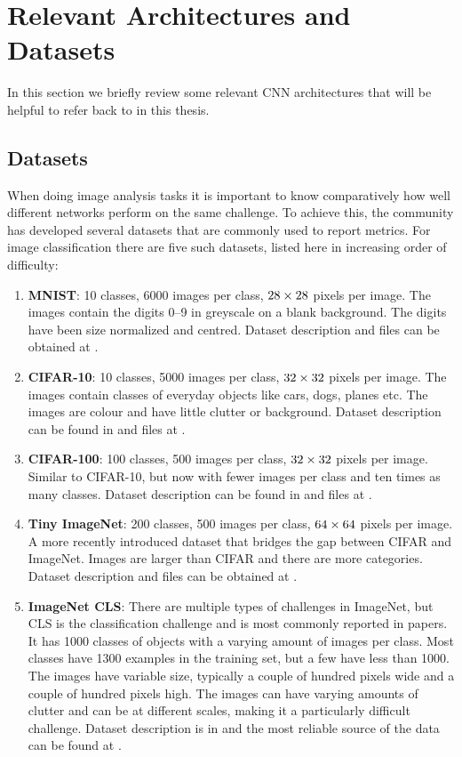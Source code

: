 \section{Relevant Architectures and Datasets}
In this section we briefly review some relevant CNN architectures that will be
helpful to refer back to in this thesis.

\subsection{Datasets}
When doing image analysis tasks it is important to know comparatively how well
different networks perform on the same challenge. To achieve this, the
community has developed several datasets that are commonly used to report
metrics. For image classification there are five such datasets, listed here in
increasing order of difficulty:
\begin{enumerate}
  \item \textbf{MNIST}: 10 classes, 6000 images per class, $28\times 28$ pixels per image.
    The images contain the digits 0--9 in greyscale on a blank background. The
    digits have been size normalized and centred. Dataset description and files can be obtained
    at \cite{lecun_modified_1998}.
  \item \textbf{CIFAR-10}: 10 classes, 5000 images per class, $32\times 32$ pixels per image.
    The images contain classes of everyday objects like cars, dogs, planes etc.
    The images are colour and have little clutter or background. Dataset
    description can be found in \cite{krizhevsky_learning_2009} and files at
    \cite{krizhevsky_cifar_2009}.
  \item \textbf{CIFAR-100}: 100 classes, 500 images per class, $32\times 32$ pixels per image.
    Similar to CIFAR-10, but now with fewer images per class and ten times as
    many classes. Dataset description can be found in
    \cite{krizhevsky_learning_2009} and files at \cite{krizhevsky_cifar_2009}.
  \item \textbf{Tiny ImageNet}: 200 classes, 500 images per class,
    $64 \times 64$ pixels per image. A more recently introduced dataset that bridges
    the gap between CIFAR and ImageNet. Images are larger than CIFAR and there
    are more categories. Dataset description and files can be obtained at \cite{li_tiny_2017}.
  \item \textbf{ImageNet CLS}: There are multiple types of challenges in ImageNet, but CLS
    is the classification challenge and is most commonly reported in papers.
    It has 1000 classes of objects with a varying amount of images per class.
    Most classes have 1300 examples in the training set, but a few have less
    than 1000. The images have variable size, typically a couple of hundred
    pixels wide and a couple of hundred pixels high. The images can have varying
    amounts of clutter and can be at different scales, making it a particularly
    difficult challenge. Dataset description is in
    \cite{russakovsky_imagenet_2015-1} and the most reliable source of the data
    can be found at \cite{stanford_vision_lab_imagenet_2017}.
\end{enumerate}
